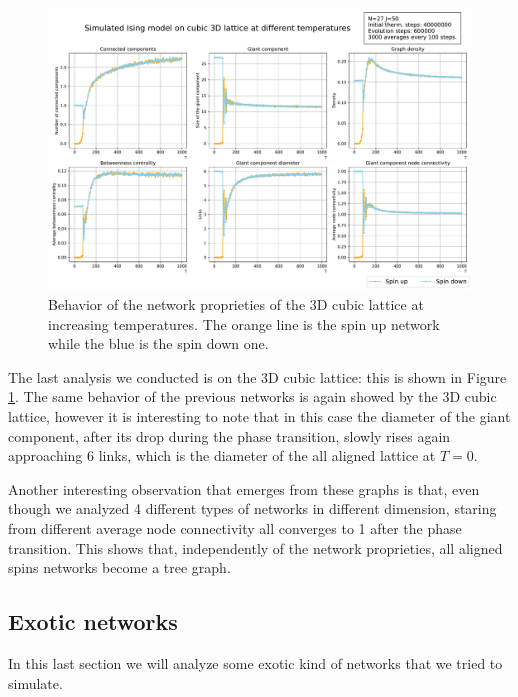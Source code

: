 \begin{figure}[!htb]
  \includegraphics[width=\linewidth]{Network meausres/3D_Network.pdf}
    \caption{Behavior of the network proprieties of the 3D cubic lattice at increasing temperatures. The orange line is the spin up network while the blue is the spin down one.}
    \label{Fig:3DNetworkmeasure}
\end{figure}

The last analysis we conducted is on the 3D cubic lattice: this is shown in Figure \ref{Fig:3DNetworkmeasure}. The same behavior of the previous networks is again showed by the 3D cubic lattice, however it is interesting to note that in this case the diameter of the giant component, after its drop during the phase transition, slowly rises again approaching $6$ links, which is the diameter of the all aligned lattice at $T=0$.

Another interesting observation that emerges from these graphs is that, even though we analyzed 4 different types of networks in different dimension, staring from different average node connectivity all converges to 1 after the phase transition. This shows that, independently of the network proprieties, all aligned spins networks become a tree graph. 

\subsection{Exotic networks}
In this last section we will analyze some exotic kind of networks that we tried to simulate.
